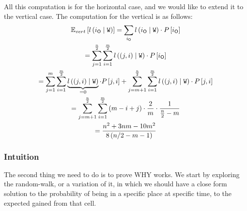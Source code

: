 \documentclass[a4paper,11pt]{article}
\theoremstyle{definition}
\newcommand{\opp}{{{\sf O}}\xspace}
\newcommand{\io}{{\ensuremath{i_{\opp}}}\xspace}
\newcommand{\w}{{{\texttt W}}\xspace}
\newcommand{\fcc}{{{\sf{FCC}}}\xspace}
\newcommand{\ltr}{{{\sf{LTR}}}\xspace}
\begin{document}
All this computation is for the horizontal case, and we would like to extend it to the vertical case.
The computation for the vertical is as follows:
\begin{multline}
    \mathbb{E}_{vert}\left[l\left(\io\mid \w\right)\right]=\sum_{\io}{l\left(\io\mid \w\right)\cdot P\left[\io\right]}
    \\=\sum_{j=1}^{\frac{n}{2}}\sum_{i=1}^{\frac{m}{2}}{l\left(\left(j,i\right)\mid \w\right)\cdot P\left[\io\right]}
    \\=\sum_{j=1}^{m}\sum_{i=1}^{\frac{m}{2}}{\underbrace{l\left(\left(j,i\right)\mid \w\right)}_{=0}\cdot P\left[j,i\right]}+\sum_{j=m+1}^{\frac{n}{2}}\sum_{i=1}^{\frac{m}{2}}{l\left(\left(j,i\right)\mid \w\right)\cdot P\left[j,i\right]}
    \\=\sum_{j=m+1}^{\frac{n}{2}}\sum_{i=1}^{\frac{m}{2}}{\left(m-i+j\right)\cdot \frac{2}{m}\cdot \frac{1}{\frac{n}{2}-m}}
    \\=\frac{n^2 + 3 n m - 10 m^2}{8 \left(n/2 - m - 1\right)}
\end{multline}






\subsubsection{\ltr Intuition}
The second thing we need to do is to prove WHY \ltr works. We start by exploring the random-walk, or a variation of it, in which we should have a close form solution to the probability of being in a specific place at specific time, to the expected \fcc gained from that cell. 
\end{document}
